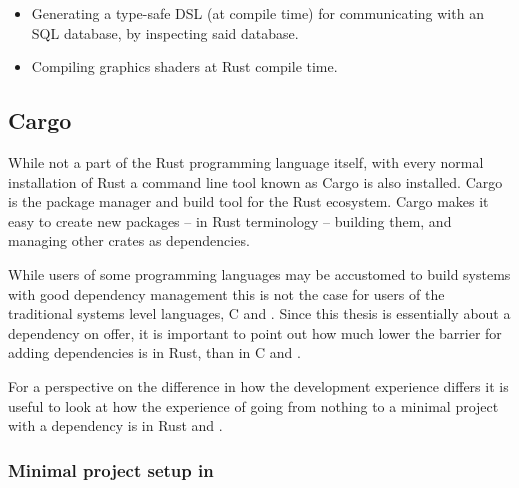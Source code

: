 \begin{itemize}
  \item Generating a type-safe DSL (at compile time) for communicating with an SQL database, by inspecting said database.\cite{diesel}
  \item Compiling graphics shaders at Rust compile time.\cite{vulkano}
\end{itemize}


\subsection{Cargo}

While not a part of the Rust programming language itself, with every normal installation of Rust a command line tool known as Cargo is also installed. Cargo is the package manager and build tool for the Rust ecosystem. Cargo makes it easy to create new packages --  in Rust terminology -- building them, and managing other crates as dependencies.

While users of some programming languages may be accustomed to build systems with good dependency management this is not the case for users of the traditional systems level languages, C and \cpp. Since this thesis is essentially about a dependency on offer, it is important to point out how much lower the barrier for adding dependencies is in Rust, than in C and \cpp.

For a perspective on the difference in how the development experience differs it is useful to look at how the experience of going from nothing to a minimal project with a dependency is in Rust and \cpp.

\subsubsection{Minimal project setup in \cpp}

